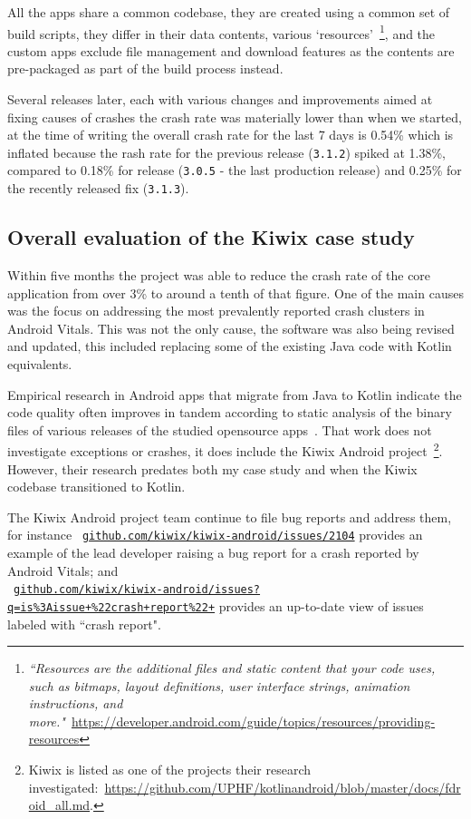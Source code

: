 All the apps share a common codebase, they are created using a common set of build scripts, they differ in their data contents, various `resources'~\footnote{\emph{``Resources are the additional files and static content that your code uses, such as bitmaps, layout definitions, user interface strings, animation instructions, and more."}~\url{https://developer.android.com/guide/topics/resources/providing-resources}}, and the custom apps exclude file management and download features as the contents are pre-packaged as part of the build process instead.

Several releases later, each with various changes and improvements aimed at fixing causes of crashes the crash rate was materially lower than when we started, at the time of writing the overall crash rate for the last 7 days is 0.54\% which is inflated because the rash rate for the previous release (\texttt{3.1.2}) spiked at 1.38\%, compared to 0.18\% for release (\texttt{3.0.5} -  the last production release) and 0.25\% for the recently released fix (\texttt{3.1.3}).

\subsection{Overall evaluation of the Kiwix case study}
Within five months the project was able to reduce the crash rate of the core application from over 3\% to around a tenth of that figure. One of the main causes was the focus on addressing the most prevalently reported crash clusters in Android Vitals. This was not the only cause, the software was also being revised and updated, this included replacing some of the existing Java code with Kotlin equivalents. 

Empirical research in Android apps that migrate from Java to Kotlin indicate the code quality often improves in tandem according to static analysis of the binary files of various releases of the studied opensource apps~\cite{GoisMateus2019_an_empirical_study_on_the_quality_of_android_apps_in_kotlin}. That work does not investigate exceptions or crashes, it does include the Kiwix Android project~\footnote{Kiwix is listed as one of the projects their research investigated:~\url{https://github.com/UPHF/kotlinandroid/blob/master/docs/fdroid_all.md}.}. However, their research predates both my case study and when the Kiwix codebase transitioned to Kotlin.

The Kiwix Android project team continue to file bug reports and address them, for instance {\small~\href{https://github.com/kiwix/kiwix-android/issues/2104}{\texttt{github.com/kiwix/kiwix-android/issues/2104}}} 
provides an example of the lead developer raising a bug report for a crash reported by Android Vitals; and \\{\small ~\href{https://github.com/kiwix/kiwix-android/issues?q=is\%3Aissue+\%22crash+report\%22+}{\texttt{github.com/kiwix/kiwix-android/issues?q=is\%3Aissue+\%22crash+report\%22+}}} provides an up-to-date view of issues labeled with ``crash report". 

